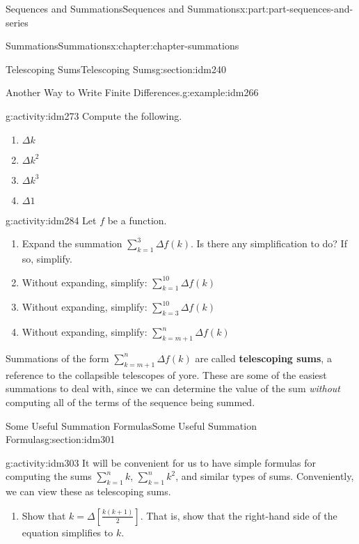 \documentclass[oneside,10pt,]{book}
\newcommand{\terminology}[1]{\textbf{#1}}
\numberwithin{equation}{section}
\begin{document}
\begin{partptx}{Sequences and Summations}{}{Sequences and Summations}{}{}{x:part:part-sequences-and-series}
\begin{chapterptx}{Summations}{}{Summations}{}{}{x:chapter:chapter-summations}
\begin{sectionptx}{Telescoping Sums}{}{Telescoping Sums}{}{}{g:section:idm240}
\begin{example}{Another Way to Write Finite Differences.}{g:example:idm266}
\end{example}
\begin{activity}{}{g:activity:idm273}%
Compute the following.%
\begin{enumerate}[font=\bfseries,label=(\alph*),ref=\alph*]
\item{}\(\Delta k\)\item{}\(\Delta k^2\)\item{}\(\Delta k^3\)\item{}\(\Delta 1\)\end{enumerate}
\end{activity}
\begin{activity}{}{g:activity:idm284}%
Let \(f\) be a function.%
\begin{enumerate}[font=\bfseries,label=(\alph*),ref=\alph*]
\item{}Expand the summation \(\displaystyle\sum_{k = 1}^3 \Delta f(k)\). Is there any simplification to do? If so, simplify.%
\item{}Without expanding, simplify: \(\displaystyle\sum_{k = 1}^{10} \Delta f(k)\)\item{}Without expanding, simplify: \(\displaystyle\sum_{k = 3}^{10} \Delta f(k)\)\item{}Without expanding, simplify: \(\displaystyle\sum_{k = m+1}^{n} \Delta f(k)\)\end{enumerate}
\end{activity}
Summations of the form \(\displaystyle\sum_{k = m+1}^n \Delta f(k)\) are called \terminology{telescoping sums}, a reference to the collapsible telescopes of yore. These are some of the easiest summations to deal with, since we can determine the value of the sum \emph{without} computing all of the terms of the sequence being summed.%
\end{sectionptx}
%
%
\typeout{************************************************}
\typeout{************************************************}
%
\begin{sectionptx}{Some Useful Summation Formulas}{}{Some Useful Summation Formulas}{}{}{g:section:idm301}
\begin{activity}{}{g:activity:idm303}%
It will be convenient for us to have simple formulas for computing the sums \(\displaystyle\sum_{k=1}^n k\), \(\displaystyle\sum_{k=1}^n k^2\), and similar types of sums. Conveniently, we can view these as telescoping sums.%
\begin{enumerate}[font=\bfseries,label=(\alph*),ref=\alph*]
\item{}Show that \(k = \Delta \left[\frac{k(k+1)}{2}\right]\). That is, show that the right-hand side of the equation simplifies to \(k\).%

\end{enumerate}
\end{activity}
\end{sectionptx}
\end{chapterptx}
\end{partptx}
\end{document}
